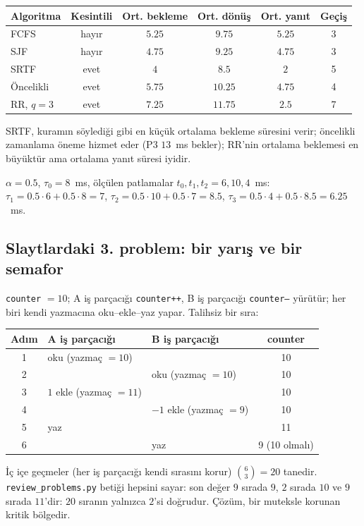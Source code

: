 \begin{center}
\renewcommand{\arraystretch}{1.2}
\begin{tabular}{@{}lccccc@{}}
\toprule
\textbf{Algoritma} & \textbf{Kesintili} & \textbf{Ort. bekleme} & \textbf{Ort. dönüş} & \textbf{Ort. yanıt} & \textbf{Geçiş}\\
\midrule
FCFS & hayır & $5.25$ & $9.75$ & $5.25$ & 3\\
SJF & hayır & $4.75$ & $9.25$ & $4.75$ & 3\\
SRTF & evet & $4$ & $8.5$ & $2$ & 5\\
Öncelikli & evet & $5.75$ & $10.25$ & $4.75$ & 4\\
RR, $q=3$ & evet & $7.25$ & $11.75$ & $2.5$ & 7\\
\bottomrule
\end{tabular}
\end{center}
SRTF, kuramın söylediği gibi en küçük ortalama bekleme süresini verir; öncelikli zamanlama öneme hizmet eder (P3 $13$~ms bekler); RR'nin ortalama beklemesi en büyüktür ama ortalama yanıt süresi iyidir.

\begin{example}
$\alpha = 0.5$, $\tau_0 = 8$~ms, ölçülen patlamalar $t_0, t_1, t_2 = 6, 10, 4$~ms: $\tau_1 = 0.5\cdot6 + 0.5\cdot8 = 7$, $\tau_2 = 0.5\cdot10 + 0.5\cdot7 = 8.5$, $\tau_3 = 0.5\cdot4 + 0.5\cdot8.5 = 6.25$~ms.
\end{example}

\subsection{Slaytlardaki 3. problem: bir yarış ve bir semafor}
\texttt{counter} $= 10$; A iş parçacığı \texttt{counter++}, B iş parçacığı \texttt{counter--} yürütür; her biri kendi yazmacına oku--ekle--yaz yapar. Talihsiz bir sıra:
\begin{center}
\renewcommand{\arraystretch}{1.15}
\begin{tabular}{@{}cllc@{}}
\toprule
\textbf{Adım} & \textbf{A iş parçacığı} & \textbf{B iş parçacığı} & \textbf{counter}\\
\midrule
1 & oku (yazmaç $=10$) & & 10\\
2 & & oku (yazmaç $=10$) & 10\\
3 & $1$ ekle (yazmaç $=11$) & & 10\\
4 & & $-1$ ekle (yazmaç $=9$) & 10\\
5 & yaz & & 11\\
6 & & yaz & 9 (10 olmalı)\\
\bottomrule
\end{tabular}
\end{center}
İç içe geçmeler (her iş parçacığı kendi sırasını korur) $\binom{6}{3} = 20$ tanedir. \texttt{review\_problems.py} betiği hepsini sayar: son değer $9$ sırada $9$, $2$ sırada $10$ ve $9$ sırada $11$'dir: $20$ sıranın yalnızca $2$'si doğrudur. Çözüm, bir muteksle korunan kritik bölgedir.

